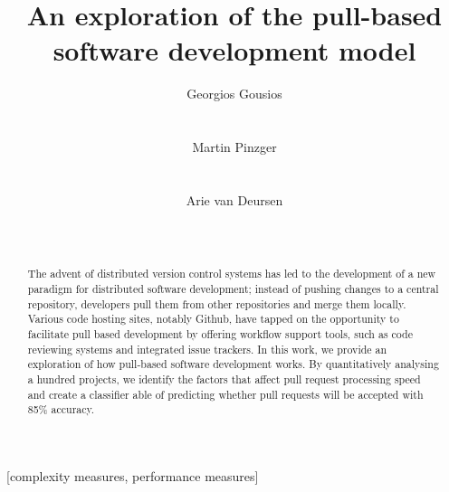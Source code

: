\documentclass{sig-alternate}
\begin{document}
\newcommand{\todo}[1]{\textbf{TODO}\footnote{\textbf{TODO:} #1}}

\title{An exploration of the pull-based software development model}

\author{
\alignauthor
Georgios Gousios\\
       \\
       \\
\alignauthor
Martin Pinzger\\
       \\
       \\
\alignauthor
Arie van Deursen\\
       \\
       \\       
}

\maketitle

\begin{abstract}

  The advent of distributed version control systems has led to the development
  of a new paradigm for distributed software development; instead of pushing
  changes to a central repository, developers pull them from other repositories
  and merge them locally. Various code hosting sites, notably Github, have
  tapped on the opportunity to facilitate pull based development by offering
  workflow support tools, such as code reviewing systems and integrated issue
  trackers. In this work, we provide an exploration of how pull-based software
  development works. By quantitatively analysing a hundred projects, we
  identify the factors that affect pull request processing speed and
  create a classifier able of predicting whether pull requests will be accepted
  with 85\% accuracy.  

\end{abstract}

[complexity measures, performance measures]
\end{document}
